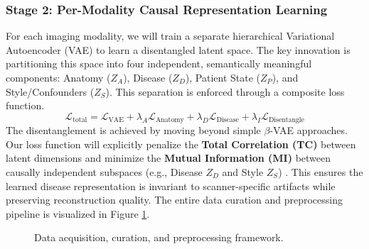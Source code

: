 \documentclass[11pt, a4paper]{article}
\begin{document}
\subsubsection{Stage 2: Per-Modality Causal Representation Learning}
For each imaging modality, we will train a separate hierarchical Variational Autoencoder (VAE) to learn a disentangled latent space. The key innovation is partitioning this space into four independent, semantically meaningful components: Anatomy ($Z_A$), Disease ($Z_D$), Patient State ($Z_P$), and Style/Confounders ($Z_S$). This separation is enforced through a composite loss function.
$$ \mathcal{L}_{\text{total}} = \mathcal{L}_{\text{VAE}} + \lambda_A \mathcal{L}_{\text{Anatomy}} + \lambda_D \mathcal{L}_{\text{Disease}} + \lambda_I \mathcal{L}_{\text{Disentangle}} $$
The disentanglement is achieved by moving beyond simple $\beta$-VAE approaches. Our loss function will explicitly penalize the \textbf{Total Correlation (TC)} between latent dimensions and minimize the \textbf{Mutual Information (MI)} between causally independent subspaces (e.g., Disease $Z_D$ and Style $Z_S$) \cite{FragemannArdizzone2022, AbbasiMonadjemi2018, FayCobos2023}. This ensures the learned disease representation is invariant to scanner-specific artifacts while preserving reconstruction quality. The entire data curation and preprocessing pipeline is visualized in Figure \ref{fig:data_curation}.

\begin{figure}[H]
    \centering
    \caption{Data acquisition, curation, and preprocessing framework.}
    \label{fig:data_curation}
\end{figure}
\end{document}
